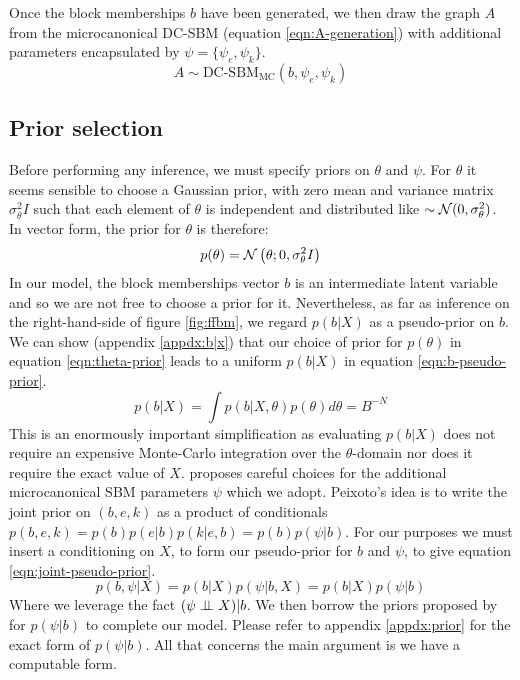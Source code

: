 Once the block memberships $b$ have been generated, we then draw the graph $A$ from the microcanonical DC-SBM (equation \ref{eqn:A-generation}) with additional parameters encapsulated by $\psi = \{\psi_e, \psi_k\}$.
%
\begin{equation}
	A \sim \textrm{DC-SBM}_{\textrm{MC}} (b, \psi_e, \psi_k)
	\label{eqn:A-generation}
\end{equation}


\subsection{Prior selection}

Before performing any inference, we must specify priors on $\theta$ and $\psi$. For $\theta$ it seems sensible to choose a Gaussian prior, with zero mean and variance matrix $\sigma^2_\theta I$ such that each element of $\theta$ is independent and distributed like $\sim \mathcal{N}(0, \sigma_\theta^2)$. In vector form, the prior for $\theta$ is therefore:
%
\begin{equation}
	p(\theta) = \mathcal{N} \left( \theta ; 0, \sigma_\theta^2 I \right)
	\label{eqn:theta-prior}
\end{equation}
%
In our model, the block memberships vector $b$ is an intermediate latent variable and so we are not free to choose a prior for it. Nevertheless, as far as inference on the right-hand-side of figure \ref{fig:ffbm}, we regard $p(b | X)$ as a pseudo-prior on $b$. We can show (appendix \ref{appdx:b|x}) that our choice of prior for $p(\theta)$ in equation \ref{eqn:theta-prior} leads to a uniform $p(b | X)$ in equation \ref{eqn:b-pseudo-prior}.
%
\begin{equation}
	p(b | X) = \int p(b | X, \theta) p(\theta) d\theta = B^{-N}
	\label{eqn:b-pseudo-prior}
\end{equation}
%
This is an enormously important simplification as evaluating $p(b | X)$ does not require an expensive Monte-Carlo integration over the $\theta$-domain nor does it require the exact value of $X$. \citet{Peixoto-Bayesian-Microcanonical} proposes careful choices for the additional microcanonical SBM parameters $\psi$ which we adopt. Peixoto's idea is to write the joint prior on $(b, e, k)$ as a product of conditionals $p(b, e, k) = p(b) p(e | b) p(k | e, b)= p(b) p(\psi | b)$. For our purposes we must insert a conditioning on $X$, to form our pseudo-prior for $b$ and $\psi$, to give equation \ref{eqn:joint-pseudo-prior}.
%
\begin{equation}
	p(b, \psi | X) = p(b | X) p(\psi | b, X) = p(b | X) p(\psi | b)
	\label{eqn:joint-pseudo-prior}
\end{equation}
%
Where we leverage the fact $(\psi \perp \!\!\! \perp X) | b$. We then borrow the priors proposed by \citet{Peixoto-Bayesian-Microcanonical} for $p(\psi | b)$ to complete our model. Please refer to appendix \ref{appdx:prior} for the exact form of $p(\psi | b)$. All that concerns the main argument is we have a computable form.
